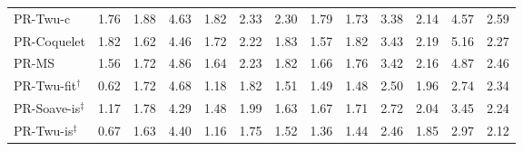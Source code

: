 \begin{table}[H]
\begin{tabular}{lcccccccccccc}
PR-Twu-c & 1.76 & 1.88 & 4.63 & 1.82 & 2.33 & 2.30 & 1.79 & 1.73 & 3.38 & 2.14 & 4.57 & 2.59 \\
PR-Coquelet & 1.82 & 1.62 & 4.46 & 1.72 & 2.22 & 1.83 & 1.57 & 1.82 & 3.43 & 2.19 & 5.16 & 2.27 \\
PR-MS & 1.56 & 1.72 & 4.86 & 1.64 & 2.23 & 1.82 & 1.66 & 1.76 & 3.42 & 2.16 & 4.87 & 2.46 \\
\midrule
PR-Twu-fit$^{\dagger}$ & 0.62 & 1.72 & 4.68 & 1.18 & 1.82 & 1.51 & 1.49 & 1.48 & 2.50 & 1.96 & 2.74 & 2.34 \\
PR-Soave-is$^{\ddagger}$ & 1.17 & 1.78 & 4.29 & 1.48 & 1.99 & 1.63 & 1.67 & 1.71 & 2.72 & 2.04 & 3.45 & 2.24 \\
PR-Twu-is$^{\ddagger}$ & 0.67 & 1.63 & 4.40 & 1.16 & 1.75 & 1.52 & 1.36 & 1.44 & 2.46 & 1.85 & 2.97 & 2.12 \\
\bottomrule
\end{tabular}
\end{table}
